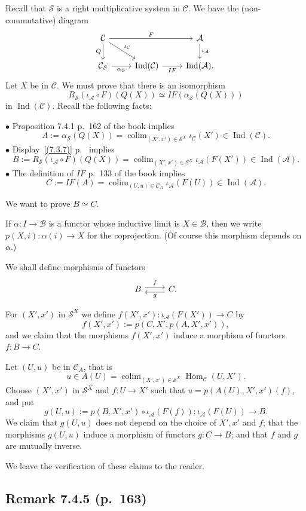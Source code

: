 \documentclass[12pt]{article}
\theoremstyle{remark}
\theoremstyle{definition}
\newcommand{\bu}{\bullet}
\newcommand{\nn}{\noindent}
\newcommand{\A}{\mathcal A}
\newcommand{\B}{\mathcal B}
\newcommand{\C}{\mathcal C}
\newcommand{\SSS}{\mathcal S}
\DeclareMathOperator*{\colim}{colim}
\DeclareMathOperator{\Hom}{Hom}
\DeclareMathOperator{\Ind}{Ind}
\begin{document}
Recall that $\SSS$ is a right multiplicative system in $\C$. We have the (non-commutative) diagram
$$
\begin{tikzcd}
\C\ar{rr}{F}\ar{d}[swap]{Q}\ar{dr}{\iota_\C}&&\A\ar{d}{\iota_\A}\\ 
\C_\SSS\ar{r}[swap]{\alpha_\SSS}&\Ind(\C)\ar{r}[swap]{IF}&\Ind(\A).
\end{tikzcd}
$$
Let $X$ be in $\C$. We must prove that there is an isomorphism 
$$
R_\SSS(\iota_\A\circ F)(Q(X))\simeq IF(\alpha_\SSS(Q(X)))
$$ 
in $\Ind(\C)$. Recall the following facts: 

\nn$\bu$ Proposition 7.4.1 p.~162 of the book implies
$$
A:=\alpha_\SSS(Q(X))=\colim_{(X',x')\in\SSS^X}\iota_\C(X')\in\Ind(\C).
$$ 
$\bu$ Display~\eqref{(7.3.7)} p.~\pageref{(7.3.7)} implies
$$
B:=R_\SSS(\iota_\A\circ F)(Q(X))=\colim_{(X',x')\in\SSS^X}\iota_\A(F(X'))\in\Ind(\A).
$$
$\bu$ The definition of $IF$ p.~133 of the book implies
$$
C:=IF(A)=\colim_{(U,u)\in\C_A}\iota_\A(F(U))\in\Ind(\A).
$$

We want to prove $B\simeq C$.

\nn{\em Notation.} If $\alpha:I\to\B$ is a functor whose inductive limit is $X\in\B$, then we write $p(X,i):\alpha(i)\to X$ for the coprojection. (Of course this morphism depends on $\alpha$.) 

We shall define morphisms of functors 
$$
\begin{tikzcd}
B\ar[yshift=.7ex]{r}{f}&C\ar[yshift=-.7ex]{l}{g}.
\end{tikzcd}
$$

For $(X',x')$ in $\SSS^X$ we define $f(X',x'):\iota_\A(F(X'))\to C$ by 
$$
f(X',x'):=p(C,X',p(A,X',x')),
$$ 
and we claim that the morphisms $f(X',x')$ induce a morphism of functors $f:B\to C$. 

Let $(U,u)$ be in $\C_A$, that is
$$
u\in A(U)=\colim_{(X',x')\in\SSS^X}\Hom_\C(U,X').
$$ 
Choose $(X',x')$ in $\SSS^X$ and $f:U\to X'$ such that $u=p(A(U),X',x')(f)$, and put 
$$
g(U,u):=p(B,X',x')\circ\iota_\A(F(f)):\iota_\A(F(U))\to B.
$$ 
We claim that $g(U,u)$ does not depend on the choice of $X',x'$ and $f$; that the morphisms $g(U,u)$ induce a morphism of functors $g:C\to B$; and that $f$ and $g$ are mutually inverse. 

We leave the verification of these claims to the reader. 


\subsection{Remark 7.4.5 (p.~163)}\label{745}
\end{document}
